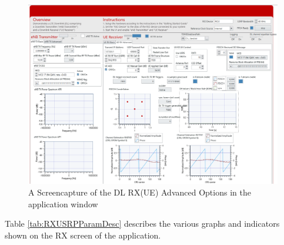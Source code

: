 \begin{figure}[H]
    \centering
    \includegraphics[width=\linewidth]{images/MIMORXADV.png}
    \caption{A Screencapture of the DL RX(UE) Advanced Options in the application window}
    \label{fig:DLRXAdvScreen}
\end{figure}

Table \ref{tab:RXUSRPParamDesc} describes the various graphs and indicators shown on the RX screen of the application.

